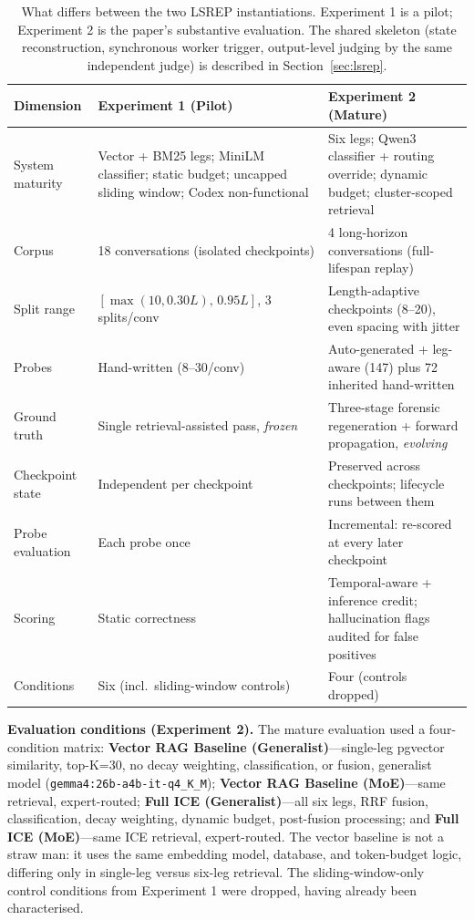 \documentclass[11pt,a4paper]{article}
\begin{document}
\begin{table}[htbp]
\centering
\small
\caption{What differs between the two LSREP instantiations. Experiment 1 is a pilot; Experiment 2 is the paper's substantive evaluation. The shared skeleton (state reconstruction, synchronous worker trigger, output-level judging by the same independent judge) is described in Section~\ref{sec:lsrep}.}
\label{tab:exp-diff}
\begin{tabular}{@{}L{3.3cm}L{5.0cm}L{5.0cm}@{}}
\toprule
\textbf{Dimension} & \textbf{Experiment 1 (Pilot)} & \textbf{Experiment 2 (Mature)} \\
\midrule
System maturity & Vector + BM25 legs; MiniLM classifier; static budget; uncapped sliding window; Codex non-functional & Six legs; Qwen3 classifier + routing override; dynamic budget; cluster-scoped retrieval \\
Corpus & 18 conversations (isolated checkpoints) & 4 long-horizon conversations (full-lifespan replay) \\
Split range & $[\max(10,0.30L),\,0.95L]$, 3 splits/conv & Length-adaptive checkpoints (8--20), even spacing with jitter \\
Probes & Hand-written (8--30/conv) & Auto-generated + leg-aware (147) plus 72 inherited hand-written \\
Ground truth & Single retrieval-assisted pass, \emph{frozen} & Three-stage forensic regeneration + forward propagation, \emph{evolving} \\
Checkpoint state & Independent per checkpoint & Preserved across checkpoints; lifecycle runs between them \\
Probe evaluation & Each probe once & Incremental: re-scored at every later checkpoint \\
Scoring & Static correctness & Temporal-aware + inference credit; hallucination flags audited for false positives \\
Conditions & Six (incl.\ sliding-window controls) & Four (controls dropped) \\
\bottomrule
\end{tabular}
\end{table}

\textbf{Evaluation conditions (Experiment 2).} The mature evaluation used a four-condition matrix: \textbf{Vector RAG Baseline (Generalist)}---single-leg pgvector similarity, top-K=30, no decay weighting, classification, or fusion, generalist model (\texttt{gemma4:26b-a4b-it-q4\_K\_M}); \textbf{Vector RAG Baseline (MoE)}---same retrieval, expert-routed; \textbf{Full ICE (Generalist)}---all six legs, RRF fusion, classification, decay weighting, dynamic budget, post-fusion processing; and \textbf{Full ICE (MoE)}---same ICE retrieval, expert-routed. The vector baseline is not a straw man: it uses the same embedding model, database, and token-budget logic, differing only in single-leg versus six-leg retrieval. The sliding-window-only control conditions from Experiment 1 were dropped, having already been characterised.
\end{document}
